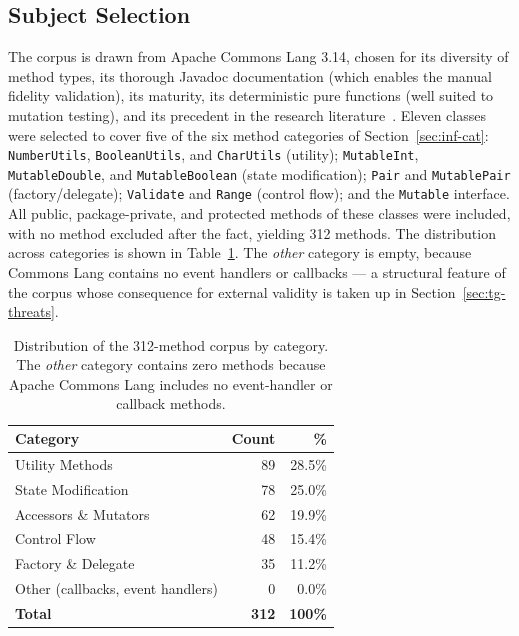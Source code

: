 \subsection{Subject Selection}

The corpus is drawn from Apache Commons Lang 3.14, chosen for its diversity of
method types, its thorough Javadoc documentation (which enables the manual
fidelity validation), its maturity, its deterministic pure functions (well
suited to mutation testing), and its precedent in the research
literature~\cite{pacheco2007randoop, fraser2011evosuite}. Eleven classes were
selected to cover five of the six method categories of
Section~\ref{sec:inf-cat}: \texttt{NumberUtils}, \texttt{BooleanUtils}, and
\texttt{CharUtils} (utility); \texttt{MutableInt}, \texttt{MutableDouble}, and
\texttt{MutableBoolean} (state modification); \texttt{Pair} and
\texttt{MutablePair} (factory/delegate); \texttt{Validate} and \texttt{Range}
(control flow); and the \texttt{Mutable} interface. All public, package-private,
and protected methods of these classes were included, with no method excluded
after the fact, yielding 312 methods. The distribution across categories is
shown in Table~\ref{tab:tg-distribution}. The \emph{other} category is empty,
because Commons Lang contains no event handlers or callbacks --- a structural
feature of the corpus whose consequence for external validity is taken up in
Section~\ref{sec:tg-threats}.

\begin{table}[ht]
\centering
\caption{Distribution of the 312-method corpus by category. The \emph{other}
category contains zero methods because Apache Commons Lang includes no
event-handler or callback methods.}
\label{tab:tg-distribution}
\begin{tabular}{lrr}
\toprule
\textbf{Category} & \textbf{Count} & \textbf{\%} \\
\midrule
Utility Methods & 89 & 28.5\% \\
State Modification & 78 & 25.0\% \\
Accessors \& Mutators & 62 & 19.9\% \\
Control Flow & 48 & 15.4\% \\
Factory \& Delegate & 35 & 11.2\% \\
Other (callbacks, event handlers) & 0 & 0.0\% \\
\midrule
\textbf{Total} & \textbf{312} & \textbf{100\%} \\
\bottomrule
\end{tabular}
\end{table}

